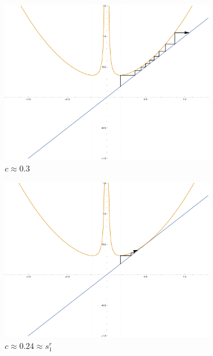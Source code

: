 \begin{figure}[ht]
		\centering
		\begin{subfigure}[b]{0.3\textwidth}
				\includegraphics[width=\textwidth]{./img/plot03}
				\caption{$c \approx 0.3$}
		\end{subfigure}%
		\begin{subfigure}[b]{0.3\textwidth}
				\includegraphics[width=\textwidth]{./img/plot025}
				\caption{$c \approx 0.24 \approx s_1^r$}
		\end{subfigure}
		\begin{subfigure}[b]{0.3\textwidth}

\end{subfigure}
\end{figure}
